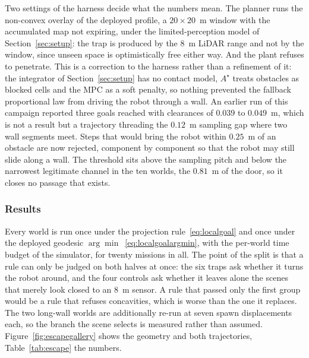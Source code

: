 \documentclass[11pt,a4paper]{article}
\newcommand{\astar}{$A^\star$}
\begin{document}
Two settings of the harness decide what the numbers mean. The planner runs the non-convex overlay of the
deployed profile, a $20\times20$~m window with the accumulated map not expiring, under the limited-perception
model of Section~\ref{sec:setup}: the trap is produced by the $8$~m LiDAR range and not by the window, since
unseen space is optimistically free either way. And the plant refuses to penetrate. This is a correction to
the harness rather than a refinement of it: the integrator of Section~\ref{sec:setup} has no contact model,
\astar{} treats obstacles as blocked cells and the MPC as a soft penalty, so nothing prevented the fallback
proportional law from driving the robot through a wall. An earlier run of this campaign reported three goals
reached with clearances of $0.039$ to $0.049$~m, which is not a result but a trajectory threading the
$0.12$~m sampling gap where two wall segments meet. Steps that would bring the robot within $0.25$~m of an
obstacle are now rejected, component by component so that the robot may still slide along a wall. The
threshold sits above the sampling pitch and below the narrowest legitimate channel in the ten worlds, the
$0.81$~m of the door, so it closes no passage that exists.

\subsubsection{Results}
\label{sec:memoryfix}

Every world is run once under the projection rule~\eqref{eq:localgoal} and once under the deployed geodesic
$\arg\min$~\eqref{eq:localgoalargmin}, with the per-world time budget of the simulator, for twenty missions
in all. The point of the split is that a rule can only be judged on both halves at once: the six traps ask
whether it turns the robot around, and the four controls ask whether it leaves alone the scenes that merely
look closed to an $8$~m sensor. A rule that passed only the first group would be a rule that refuses
concavities, which is worse than the one it replaces. The two long-wall worlds are additionally re-run at
seven spawn displacements each, so the branch the scene selects is measured rather than assumed.
Figure~\ref{fig:escapegallery} shows the geometry and both trajectories, Table~\ref{tab:escape} the numbers.
\end{document}
